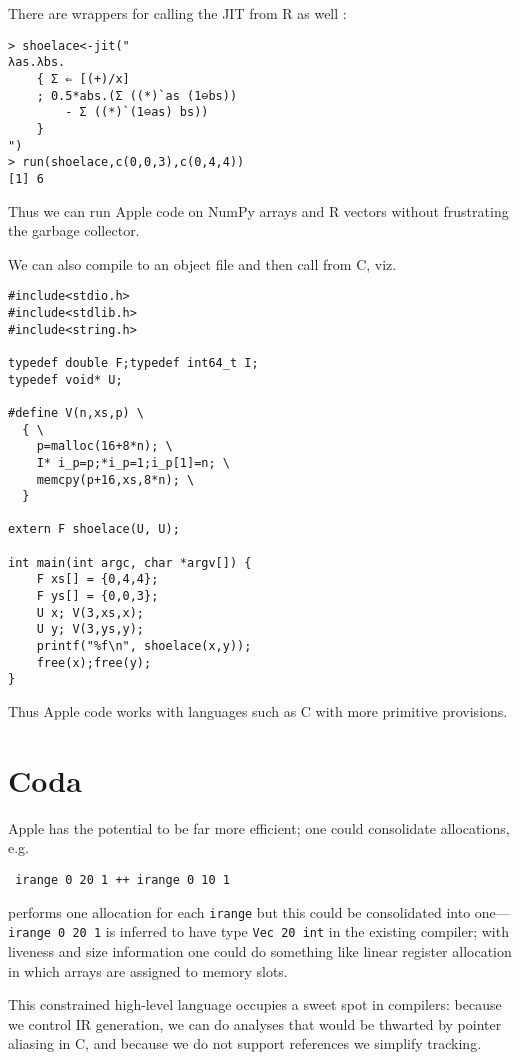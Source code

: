 \documentclass[sigplan,screen,anonymous]{acmart}
\begin{document}
There are wrappers for calling the JIT from R as well \cite{wickham}:

\begin{verbatim}
> shoelace<-jit("
λas.λbs.
    { Σ ⇐ [(+)/x]
    ; 0.5*abs.(Σ ((*)`as (1⊖bs))
        - Σ ((*)`(1⊖as) bs))
    }
")
> run(shoelace,c(0,0,3),c(0,4,4))
[1] 6
\end{verbatim}

Thus we can run Apple code on NumPy arrays and R vectors without frustrating the garbage collector.

We can also compile to an object file and then call from C, viz.

\begin{verbatim}
#include<stdio.h>
#include<stdlib.h>
#include<string.h>

typedef double F;typedef int64_t I;
typedef void* U;

#define V(n,xs,p) \
  { \
    p=malloc(16+8*n); \
    I* i_p=p;*i_p=1;i_p[1]=n; \
    memcpy(p+16,xs,8*n); \
  }

extern F shoelace(U, U);

int main(int argc, char *argv[]) {
    F xs[] = {0,4,4};
    F ys[] = {0,0,3};
    U x; V(3,xs,x);
    U y; V(3,ys,y);
    printf("%f\n", shoelace(x,y));
    free(x);free(y);
}
\end{verbatim}

Thus Apple code works with languages such as C with more primitive provisions.

\section{Coda}

Apple has the potential to be far more efficient; one could consolidate allocations, e.g.

\begin{verbatim}
 irange 0 20 1 ++ irange 0 10 1
\end{verbatim}
performs one allocation for each {\tt irange} but this could be consolidated into one---{\tt irange 0 20 1} is inferred to have type {\tt Vec 20 int} in the existing compiler; with liveness and size information one could do something like linear register allocation in which arrays are assigned to memory slots.

This constrained high-level language occupies a sweet spot in compilers: because we control IR generation, we can do analyses that would be thwarted by pointer aliasing in C, and because we do not support references we simplify tracking.



\end{document}
